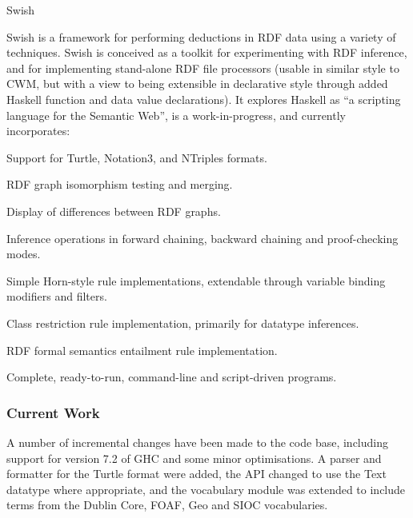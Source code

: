 \begin{hcarentry}[updated]{Swish}
\makeheader

Swish is a framework for performing deductions in RDF data using a
variety of techniques. Swish is conceived as a toolkit for
experimenting with RDF inference, and for implementing stand-alone RDF
file processors (usable in similar style to CWM, but with a view to
being extensible in declarative style through added Haskell function
and data value declarations). It explores Haskell as ``a scripting
language for the Semantic Web'', is a work-in-progress, and currently
incorporates:

\begin{compactitem}
\item
Support for Turtle, Notation3, and NTriples formats.

\item
RDF graph isomorphism testing and merging.

\item
Display of differences between RDF graphs.

\item
Inference operations in forward chaining, backward chaining and proof-checking modes.

\item
Simple Horn-style rule implementations, extendable through variable binding modifiers and filters.

\item
Class restriction rule implementation, primarily for datatype inferences.

\item
RDF formal semantics entailment rule implementation.

\item
Complete, ready-to-run, command-line and script-driven programs.
\end{compactitem}

\subsubsection*{Current Work}

A number of incremental changes have been made to the code base,
including support for version 7.2 of GHC and some minor
optimisations. A parser and formatter for the Turtle format were
added, the API changed to use the Text datatype where appropriate, and
the vocabulary module was extended to include terms from the Dublin
Core, FOAF, Geo and SIOC vocabularies.


\end{hcarentry}
